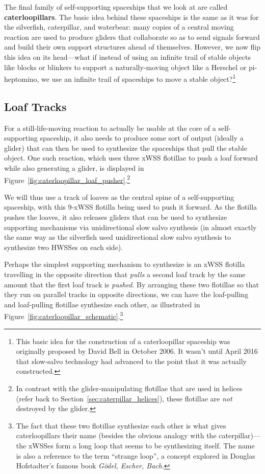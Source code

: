 The final family of self-supporting spaceships that we look at are called \textbf{caterloopillars}. The basic idea behind these spaceships is the same as it was for the silverfish, caterpillar, and waterbear: many copies of a central moving reaction are used to produce gliders that collaborate so as to send signals forward and build their own support structures ahead of themselves. However, we now flip this idea on its head---what if instead of using an infinite trail of stable objects like blocks or blinkers to support a naturally-moving object like a Herschel or pi-heptomino, we use an infinite trail of spaceships to move a stable object?\footnote{This basic idea for the construction of a caterloopillar spaceship was originally proposed by David Bell in October 2006. It wasn't until April 2016 that slow-salvo technology had advanced to the point that it was actually constructed.}


\subsection{Loaf Tracks}\label{sec:caterloopillar_loaf_track}

For a still-life-moving reaction to actually be usable at the core of a self-supporting spaceship, it also needs to produce some sort of output (ideally a glider) that can then be used to synthesize the spaceships that pull the stable object. One such reaction, which uses three xWSS flotillae to push a loaf forward while also generating a glider, is displayed in Figure~\ref{fig:caterloopillar_loaf_pusher}.\footnote{In contrast with the glider-manipulating flotillae that are used in helices (refer back to Section~\ref{sec:caterpillar_helices}), these flotillae are \emph{not} destroyed by the glider.}

We will thus use a track of loaves as the central spine of a self-supporting spaceship, with this 9-xWSS flotilla being used to push it forward. As the flotilla pushes the loaves, it also releases gliders that can be used to synthesize supporting mechanisms via unidirectional slow salvo synthesis (in almost exactly the same way as the silverfish used unidirectional slow salvo synthesis to synthesize two HWSSes on each side).

Perhaps the simplest supporting mechanism to synthesize is an xWSS flotilla travelling in the opposite direction that \emph{pulls} a second loaf track by the same amount that the first loaf track is \emph{pushed}. By arranging these two flotillae so that they run on parallel tracks in opposite directions, we can have the loaf-pulling and loaf-pulling flotillae synthesize each other, as illustrated in Figure~\ref{fig:caterloopillar_schematic}.\footnote{The fact that these two flotillae synthesize each other is what gives caterloopillars their name (besides the obvious analogy with the caterpillar)---the xWSSes form a long loop that seems to be synthesizing itself. The name is also a reference to the term ``strange loop'', a concept explored in Douglas Hofstadter's famous book \emph{G\"{o}del, Escher, Bach}.}


